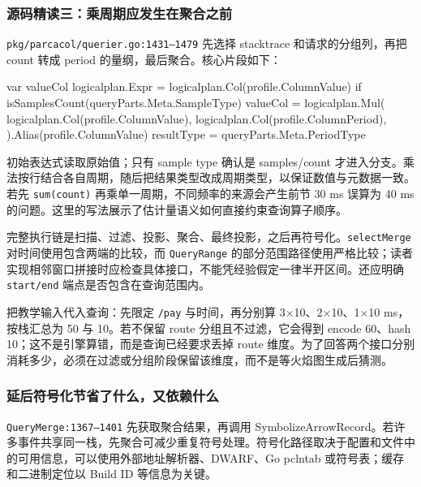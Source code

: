\documentclass[UTF8,fontset=fandol,openany,11pt]{ctexbook}
\begin{document}
\subsubsection{源码精读三：乘周期应发生在聚合之前}
\texttt{pkg/\allowbreak{}parcacol/\allowbreak{}querier.\allowbreak{}go:\allowbreak{}1431–1479} 先选择 stacktrace 和请求的分组列，再把 count 转成 period 的量纲，最后聚合。核心片段如下：\cite{proj-parca-query}

\noindent\begin{minipage}{\linewidth}
\begin{codeblock}
var valueCol logicalplan.Expr = logicalplan.Col(profile.ColumnValue)
if isSamplesCount(queryParts.Meta.SampleType) {
    valueCol = logicalplan.Mul(
        logicalplan.Col(profile.ColumnValue),
        logicalplan.Col(profile.ColumnPeriod),
    ).Alias(profile.ColumnValue)
    resultType = queryParts.Meta.PeriodType
}
\end{codeblock}
\end{minipage}

初始表达式读取原始值；只有 sample type 确认是 samples/count 才进入分支。乘法按行结合各自周期，随后把结果类型改成周期类型，以保证数值与元数据一致。若先 \texttt{sum(count)} 再乘单一周期，不同频率的来源会产生前节 30 ms 误算为 40 ms 的问题。这里的写法展示了估计量语义如何直接约束查询算子顺序。

完整执行链是扫描、过滤、投影、聚合、最终投影，之后再符号化。\texttt{selectMerge} 对时间使用包含两端的比较，而 \texttt{QueryRange} 的部分范围路径使用严格比较；读者实现相邻窗口拼接时应检查具体接口，不能凭经验假定一律半开区间。还应明确 \texttt{start/\allowbreak{}end} 端点是否包含在查询范围内。

把教学输入代入查询：先限定 \texttt{/\allowbreak{}pay} 与时间，再分别算 3\ensuremath{\times}10、2\ensuremath{\times}10、1\ensuremath{\times}10 ms，按栈汇总为 50 与 10。若不保留 route 分组且不过滤，它会得到 encode 60、hash 10；这不是引擎算错，而是查询已经要求丢掉 route 维度。为了回答两个接口分别消耗多少，必须在过滤或分组阶段保留该维度，而不是等火焰图生成后猜测。

\subsubsection{延后符号化节省了什么，又依赖什么}
\texttt{QueryMerge:\allowbreak{}1367–1401} 先获取聚合结果，再调用 SymbolizeArrowRecord。若许多事件共享同一栈，先聚合可减少重复符号处理。符号化路径取决于配置和文件中的可用信息，可以使用外部地址解析器、DWARF、Go pclntab 或符号表；缓存和二进制定位以 Build ID 等信息为关键。\cite{proj-parca}
\end{document}
